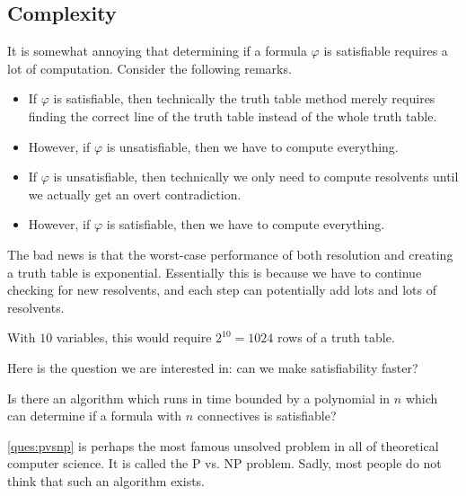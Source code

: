 \subsection{Complexity}
It is somewhat annoying that determining if a formula $\varphi$ is satisfiable requires a lot of computation. Consider the following remarks.
\begin{itemize}
	\item If $\varphi$ is satisfiable, then technically the truth table method merely requires finding the correct line of the truth table instead of the whole truth table.
	\item However, if $\varphi$ is unsatisfiable, then we have to compute everything.
	\item If $\varphi$ is unsatisfiable, then technically we only need to compute resolvents until we actually get an overt contradiction.
	\item However, if $\varphi$ is satisfiable, then we have to compute everything.
\end{itemize}
The bad news is that the worst-case performance of both resolution and creating a truth table is exponential. Essentially this is because we have to continue checking for new resolvents, and each step can potentially add lots and lots of resolvents.
\begin{example}
	With $10$ variables, this would require $2^{10}=1024$ rows of a truth table.
\end{example}
Here is the question we are interested in: can we make satisfiability faster?
\begin{ques} \label{ques:pvsnp}
	Is there an algorithm which runs in time bounded by a polynomial in $n$ which can determine if a formula with $n$ connectives is satisfiable?
\end{ques}
\autoref{ques:pvsnp} is perhaps the most famous unsolved problem in all of theoretical computer science. It is called the {P vs. NP} problem. Sadly, most people do not think that such an algorithm exists.